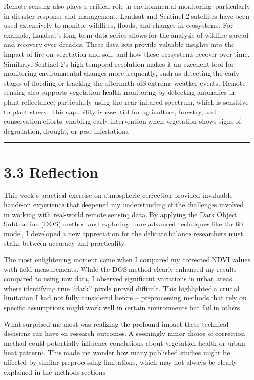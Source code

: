 \documentclass[
  letterpaper,
  DIV=11,
  numbers=noendperiod]{scrreprt}
\begin{document}
Remote sensing also plays a critical role in environmental monitoring,
particularly in disaster response and management. Landsat and Sentinel-2
satellites have been used extensively to monitor wildfires, floods, and
changes in ecosystems. For example, Landsat's long-term data series
allows for the analysis of wildfire spread and recovery over decades.
These data sets provide valuable insights into the impact of fire on
vegetation and soil, and how these ecosystems recover over time.
Similarly, Sentinel-2's high temporal resolution makes it an excellent
tool for monitoring environmental changes more frequently, such as
detecting the early stages of flooding or tracking the aftermath ofS
extreme weather events. Remote sensing also supports vegetation health
monitoring by detecting anomalies in plant reflectance, particularly
using the near-infrared spectrum, which is sensitive to plant stress.
This capability is essential for agriculture, forestry, and conservation
efforts, enabling early intervention when vegetation shows signs of
degradation, drought, or pest infestations.

\begin{center}\rule{0.5\linewidth}{0.5pt}\end{center}

\section{3.3 Reflection}\label{reflection-1}

This week's practical exercise on atmospheric correction provided
invaluable hands-on experience that deepened my understanding of the
challenges involved in working with real-world remote sensing data. By
applying the Dark Object Subtraction (DOS) method and exploring more
advanced techniques like the 6S model, I developed a new appreciation
for the delicate balance researchers must strike between accuracy and
practicality.

The most enlightening moment came when I compared my corrected NDVI
values with field measurements. While the DOS method clearly enhanced my
results compared to using raw data, I observed significant variations in
urban areas, where identifying true ``dark'' pixels proved difficult.
This highlighted a crucial limitation I had not fully considered before
-- preprocessing methods that rely on specific assumptions might work
well in certain environments but fail in others.

What surprised me most was realizing the profound impact these technical
decisions can have on research outcomes. A seemingly minor choice of
correction method could potentially influence conclusions about
vegetation health or urban heat patterns. This made me wonder how many
published studies might be affected by similar preprocessing
limitations, which may not always be clearly explained in the methods
sections.
\end{document}
